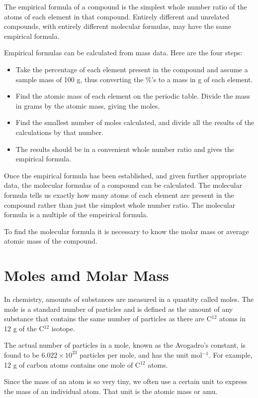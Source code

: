\documentclass[../chem.tex]{subfiles}
\begin{document}
The empirical formula of a compound is the simplest whole number ratio of the atoms of each element in that compound. 
Entirely different and unrelated compounds, with entirely different molecular formulas, may have the same empirical formula.

Empirical formulas can be calculated from mass data. Here are the four steps:
\begin{itemize}
    \item Take the percentage of each element present in the compound and assume a sample mass of 100 g, thus converting the $\%$'s to a mass in g of each element.
    \item Find the atomic mass of each element on the periodic table. Divide the mass in grams by the atomic mass, giving the moles.
    \item Find the smallest number of moles calculated, and divide all the results of the calculations by that number.
    \item The results should be in a convenient whole number ratio and gives the empirical formula.
\end{itemize}

Once the empirical formula has been established, and given further appropriate data, the molecular formulas of a compound can be calculated.
The molecular formula tells us exactly how many atoms of each element are present in the compound rather than just the simplest whole number ratio.
The molecular formula is a multiple of the empeirical formula.

To find the molecular formula it is necessary to know the molar mass or average atomic mass of the compound. 
\section{Moles amd Molar Mass}
In chemistry, amounts of substances are measured in a quantity called moles. The mole is a standard number of particles and is defined as the 
amount of any substance that contains the same number of particles as there are C$^{12}$ atoms in 12 g of the C$^{12}$ isotope.

The actual number of particles in a mole, known as the Avogadro's constant, is found to be $6.022\times10^{23}$ particles per mole, and has the unit mol$^{-1}$. 
For example, 12 g of carbon atoms contains one mole of C$^{12}$ atoms.

Since the mass of an atom is so very tiny, we often use a certain unit to express the mass of an individual atom. That unit is the atomic mass or amu. 
\end{document}
